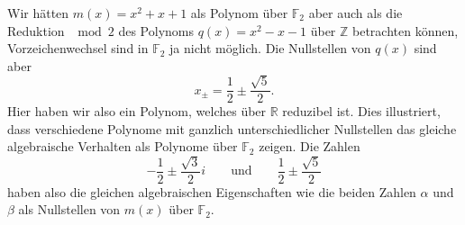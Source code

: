 \begin{beispiel}
Wir hätten $m(x)=x^2+x+1$ als Polynom über $\mathbb F_2$ aber auch
als die Reduktion $\mod 2$ des Polynoms $q(x)=x^2-x-1$ über $\mathbb Z$
betrachten können, Vorzeichenwechsel sind in $\mathbb F_2$ ja nicht
möglich.
Die Nullstellen von $q(x)$ sind aber
\[
x_{\pm}
=
\frac12\pm\frac{\sqrt{5}}2.
\]
Hier haben wir also ein Polynom, welches über $\mathbb R$ reduzibel ist.
Dies illustriert, dass verschiedene Polynome mit ganzlich unterschiedlicher
Nullstellen das gleiche algebraische Verhalten als Polynome über $\mathbb F_2$
zeigen.
Die Zahlen
\[
-\frac12\pm\frac{\sqrt{3}}{2}i
\qquad\text{und}\qquad
\frac12\pm\frac{\sqrt{5}}{2}
\]
haben also die gleichen algebraischen Eigenschaften wie die beiden Zahlen
$\alpha$ und $\beta$ als Nullstellen von $m(x)$ über $\mathbb F_2$.
\end{beispiel}


